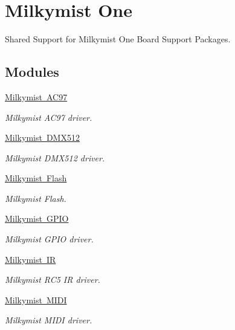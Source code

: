 \hypertarget{group__RTEMSBSPsLM32SharedMilkymistOne}{}\section{Milkymist One}
\label{group__RTEMSBSPsLM32SharedMilkymistOne}


Shared Support for Milkymist One Board Support Packages.  


\subsection*{Modules}
\begin{DoxyCompactItemize}
\item 
\mbox{\hyperlink{group__lm32__milkymist__ac97}{Milkymist A\+C97}}
\begin{DoxyCompactList}\small\item\em Milkymist A\+C97 driver. \end{DoxyCompactList}\item 
\mbox{\hyperlink{group__lm32__milkymist__dmx}{Milkymist D\+M\+X512}}
\begin{DoxyCompactList}\small\item\em Milkymist D\+M\+X512 driver. \end{DoxyCompactList}\item 
\mbox{\hyperlink{group__lm32__milkymist__flash}{Milkymist Flash}}
\begin{DoxyCompactList}\small\item\em Milkymist Flash. \end{DoxyCompactList}\item 
\mbox{\hyperlink{group__lm32__milkymist__gpio}{Milkymist G\+P\+IO}}
\begin{DoxyCompactList}\small\item\em Milkymist G\+P\+IO driver. \end{DoxyCompactList}\item 
\mbox{\hyperlink{group__lm32__milkymist__ir}{Milkymist IR}}
\begin{DoxyCompactList}\small\item\em Milkymist R\+C5 IR driver. \end{DoxyCompactList}\item 
\mbox{\hyperlink{group__lm32__milkymist__midi}{Milkymist M\+I\+DI}}
\begin{DoxyCompactList}\small\item\em Milkymist M\+I\+DI driver. \end{DoxyCompactList}\item 

\end{DoxyCompactItemize}
